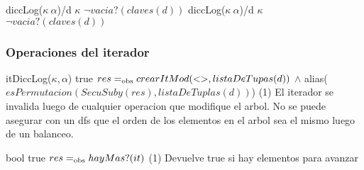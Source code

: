 {diccLog($\kappa\ \alpha$)/d}
{$\kappa$}
{$\neg vacia?(claves(d))$}
{diccLog($\kappa\ \alpha$)/d}
{$\kappa$}
{$\neg vacia?(claves(d))$}

\subsubsection{Operaciones del iterador}

{   }
{itDiccLog($\kappa, \alpha$)}
{true}
{$res =_{\mathrm{obs}} crearItMod(<>, listaDeTupas(d))$ $\land$ alias($esPermutacion(SecuSuby(res), listaDeTuplas(d))$)}
{\bigo(1)}
{El iterador se invalida luego de cualquier operacion que modifique el arbol. No se puede
    asegurar con un dfs que el orden de los elementos en el arbol sea el mismo luego de un 
    balanceo.}
{}

{    }
{bool}
{true}
{$res =_{\mathrm{obs}} hayMas?(it)$}
{\bigo(1)}
{}
{Devuelve true si hay elementos para avanzar}

